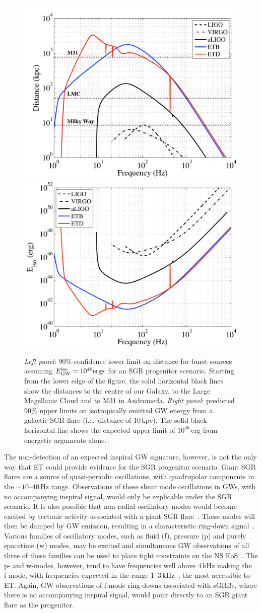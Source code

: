 \begin{figure}[tbp]
\begin{center}
\includegraphics[angle=0,width=0.45\columnwidth]{./Sec_ET_ScienceCase/SGR_distance.pdf}
\includegraphics[angle=0,width=0.45\columnwidth]{./Sec_ET_ScienceCase/SGR_energy.pdf}
\caption{\emph{Left panel}: 90\%-confidence lower limit on distance for burst sources assuming $E^{\rm iso}_{\rm GW} = 10^{46} {\rm ergs}$ for an SGR progenitor scenario.  Starting from the lower edge of the figure, the solid horizontal black lines show the distances to the centre of our Galaxy, to the Large Magellanic Cloud and to M31 in Andromeda. \emph{Right panel}: predicted 90\% upper limits on isotropically emitted GW energy from a galactic SGR flare (i.e.\  distance of 10\,kpc).  The solid black horizontal line shows the expected upper limit of $10^{46}$\,erg from energetic arguments alone.}
\label{fig:EnergyFreq_SGR}
\end{center}
\end{figure}
%
The non-detection of an expected inspiral GW signature, however, is not the only way that ET could provide evidence for the SGR progenitor scenario. Giant SGR flares are a source of quasi-periodic oscillations, with quadrupolar components in the $\sim 10$--$40$\,Hz range.  Observations of these shear mode oscillations in GWs, with no accompanying inspiral signal, would only be explicable under the SGR scenario.  It is also possible that non-radial oscillatory modes would become excited by tectonic activity associated with a giant SGR flare~\cite{Pacheco98}.  These modes will then be damped by GW emission, resulting in a characteristic ring-down signal~\cite{PriceThorne69}.  Various families of oscillatory modes, such as fluid (f), pressure (p) and purely spacetime (w) modes, may be excited and simultaneous GW observations of all three of these families can be used to place tight constraints on the NS EoS~\cite{AnderssonKokkotas1998}.  The p- and 
w-modes, however, tend to have frequencies well above 4\,kHz making the f-mode, with frequencies expected in the range $1$--$3$\,kHz~\cite{Benhar:2005}, the most accessible to ET.  Again, GW observations of f-mode ring-downs associated with sGRBs, where there is no accompanying inspiral signal, would point directly to an SGR giant flare as the progenitor.

